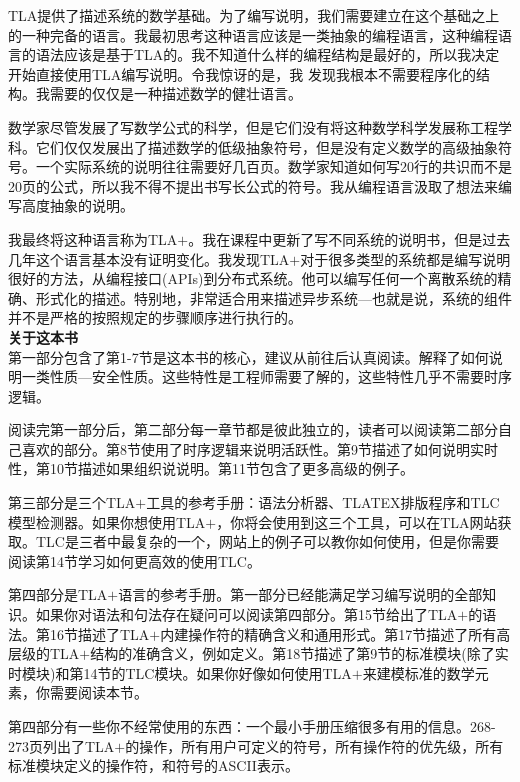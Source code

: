 \documentclass[utf8]{book}
\begin{document}
TLA提供了描述系统的数学基础。为了编写说明，我们需要建立在这个基础之上的一种完备的语言。我最初思考这种语言应该是一类抽象的编程语言，这种编程语言的语法应该是基于TLA的。我不知道什么样的编程结构是最好的，所以我决定开始直接使用TLA编写说明。令我惊讶的是，我 发现我根本不需要程序化的结构。我需要的仅仅是一种描述数学的健壮语言。

数学家尽管发展了写数学公式的科学，但是它们没有将这种数学科学发展称工程学科。它们仅仅发展出了描述数学的低级抽象符号，但是没有定义数学的高级抽象符号。一个实际系统的说明往往需要好几百页。数学家知道如何写20行的共识而不是20页的公式，所以我不得不提出书写长公式的符号。我从编程语言汲取了想法来编写高度抽象的说明。

我最终将这种语言称为TLA$+$。我在课程中更新了写不同系统的说明书，但是过去几年这个语言基本没有证明变化。我发现TLA$+$对于很多类型的系统都是编写说明很好的方法，从编程接口(APIs)到分布式系统。他可以编写任何一个离散系统的精确、形式化的描述。特别地，非常适合用来描述异步系统---也就是说，系统的组件并不是严格的按照规定的步骤顺序进行执行的。\\

\large{\textbf{关于这本书}}\\

第一部分包含了第1-7节是这本书的核心，建议从前往后认真阅读。解释了如何说明一类性质---安全性质。这些特性是工程师需要了解的，这些特性几乎不需要时序逻辑。

阅读完第一部分后，第二部分每一章节都是彼此独立的，读者可以阅读第二部分自己喜欢的部分。第8节使用了时序逻辑来说明活跃性。第9节描述了如何说明实时性，第10节描述如果组织说说明。第11节包含了更多高级的例子。

第三部分是三个TLA$+$工具的参考手册：语法分析器、TLATEX排版程序和TLC模型检测器。如果你想使用TLA$+$，你将会使用到这三个工具，可以在TLA网站获取。TLC是三者中最复杂的一个，网站上的例子可以教你如何使用，但是你需要阅读第14节学习如何更高效的使用TLC。

第四部分是TLA$+$语言的参考手册。第一部分已经能满足学习编写说明的全部知识。如果你对语法和句法存在疑问可以阅读第四部分。第15节给出了TLA$+$的语法。第16节描述了TLA$+$内建操作符的精确含义和通用形式。第17节描述了所有高层级的TLA$+$结构的准确含义，例如定义。第18节描述了第9节的标准模块(除了实时模块)和第14节的TLC模块。如果你好像如何使用TLA$+$来建模标准的数学元素，你需要阅读本节。

第四部分有一些你不经常使用的东西：一个最小手册压缩很多有用的信息。268-273页列出了TLA$+$的操作，所有用户可定义的符号，所有操作符的优先级，所有标准模块定义的操作符，和符号的ASCII表示。
\mainmatter
\end{document}
